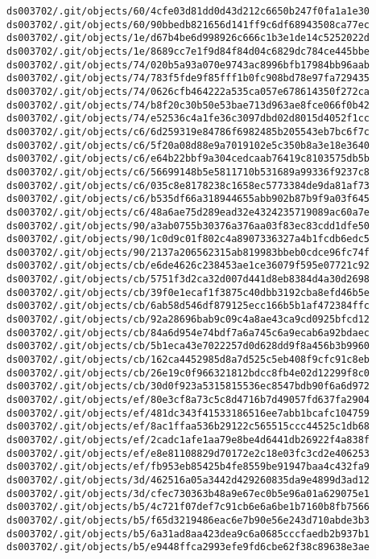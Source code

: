 \documentclass[11pt]{article}
\begin{document}
\begin{Verbatim}[commandchars=\\\{\}]
ds003702/.git/objects/60/4cfe03d81dd0d43d212c6650b247f0fa1a1e30
ds003702/.git/objects/60/90bbedb821656d141ff9c6df68943508ca77ec
ds003702/.git/objects/1e/d67b4be6d998926c666c1b3e1de14c5252022d
ds003702/.git/objects/1e/8689cc7e1f9d84f84d04c6829dc784ce445bbe
ds003702/.git/objects/74/020b5a93a070e9743ac8996bfb17984bb96aab
ds003702/.git/objects/74/783f5fde9f85fff1b0fc908bd78e97fa729435
ds003702/.git/objects/74/0626cfb464222a535ca057e678614350f272ca
ds003702/.git/objects/74/b8f20c30b50e53bae713d963ae8fce066f0b42
ds003702/.git/objects/74/e52536c4a1fe36c3097dbd02d8015d4052f1cc
ds003702/.git/objects/c6/6d259319e84786f6982485b205543eb7bc6f7c
ds003702/.git/objects/c6/5f20a08d88e9a7019102e5c350b8a3e18e3640
ds003702/.git/objects/c6/e64b22bbf9a304cedcaab76419c8103575db5b
ds003702/.git/objects/c6/56699148b5e5811710b531689a99336f9237c8
ds003702/.git/objects/c6/035c8e8178238c1658ec5773384de9da81af73
ds003702/.git/objects/c6/b535df66a318944655abb902b87b9f9a03f645
ds003702/.git/objects/c6/48a6ae75d289ead32e4324235719089ac60a7e
ds003702/.git/objects/90/a3ab0755b30376a376aa03f83ec83cdd1dfe50
ds003702/.git/objects/90/1c0d9c01f802c4a8907336327a4b1fcdb6edc5
ds003702/.git/objects/90/2137a206562315ab819983bbeb0cdce96fc74f
ds003702/.git/objects/cb/e6de4626c238453ae1ce36079f595e07721c92
ds003702/.git/objects/cb/5751f3d2ca32d007d441d8eb8384d4a30d2698
ds003702/.git/objects/cb/39f0e1ecaf1f3875c40dbb3192cba8efd46b5e
ds003702/.git/objects/cb/6ab58d546df879125ecc166b5b1af472384ffc
ds003702/.git/objects/cb/92a28696bab9c09c4a8ae43ca9cd0925bfcd12
ds003702/.git/objects/cb/84a6d954e74bdf7a6a745c6a9ecab6a92bdaec
ds003702/.git/objects/cb/5b1eca43e7022257d0d628dd9f8a456b3b9960
ds003702/.git/objects/cb/162ca4452985d8a7d525c5eb408f9cfc91c8eb
ds003702/.git/objects/cb/26e19c0f966321812bdcc8fb4e02d12299f8c0
ds003702/.git/objects/cb/30d0f923a5315815536ec8547bdb90f6a6d972
ds003702/.git/objects/ef/80e3cf8a73c5c8d4716b7d49057fd637fa2904
ds003702/.git/objects/ef/481dc343f41533186516ee7abb1bcafc104759
ds003702/.git/objects/ef/8ac1ffaa536b29122c565515ccc44525c1db68
ds003702/.git/objects/ef/2cadc1afe1aa79e8be4d6441db26922f4a838f
ds003702/.git/objects/ef/e8e81108829d70172e2c18e03fc3cd2e406253
ds003702/.git/objects/ef/fb953eb85425b4fe8559be91947baa4c432fa9
ds003702/.git/objects/3d/462516a05a3442d429260835da9e4899d3ad12
ds003702/.git/objects/3d/cfec730363b48a9e67ec0b5e96a01a629075e1
ds003702/.git/objects/b5/4c721f07def7c91cb6e6a6be1b7160b8fb7566
ds003702/.git/objects/b5/f65d3219486eac6e7b90e56e243d710abde3b3
ds003702/.git/objects/b5/6a31ad8aa423dea9c6a0685cccfaedb2b937b1
ds003702/.git/objects/b5/e9448ffca2993efe9fd6cbe62f38c89638e3ae

\end{Verbatim}
\end{document}
